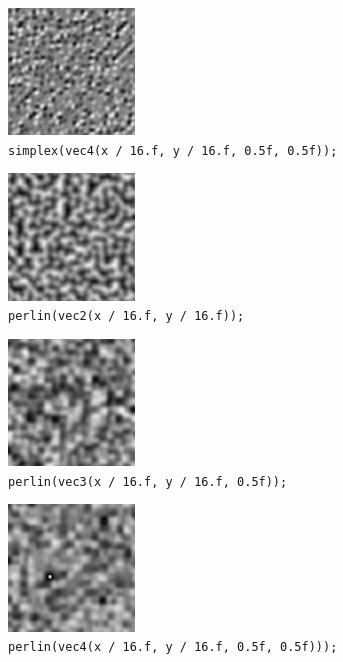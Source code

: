 \documentclass{scrartcl}
\numberwithin{figure}{subsection}
\begin{document}
\begin{figure}
  \centering
  \includegraphics[width=0.3\textwidth]{simplex3}
  \cprotect\caption{\verb|simplex(vec4(x / 16.f, y / 16.f, 0.5f, 0.5f));|}
\end{figure}

\begin{figure}
  \centering
  \includegraphics[width=0.3\textwidth]{perlin1}
  \cprotect\caption{\verb|perlin(vec2(x / 16.f, y / 16.f));|}
\end{figure}

\begin{figure}
  \centering
  \includegraphics[width=0.3\textwidth]{perlin2}
  \cprotect\caption{\verb|perlin(vec3(x / 16.f, y / 16.f, 0.5f));|}
\end{figure}

\begin{figure}
  \centering
  \includegraphics[width=0.3\textwidth]{perlin3}
  \cprotect\caption{\verb|perlin(vec4(x / 16.f, y / 16.f, 0.5f, 0.5f)));|}
\end{figure}
\end{document}
